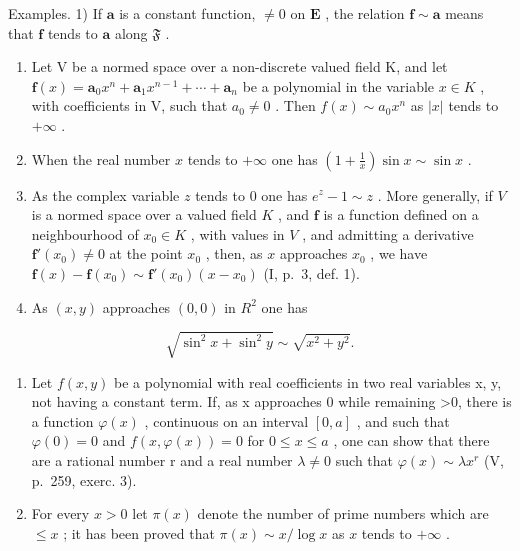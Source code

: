 Examples. 1) If \(\mathbf{a}\) is a constant function, \(\neq 0\) on \(\mathbf{E}\) , the relation \(\mathbf{f} \sim \mathbf{a}\) means that \(\mathbf{f}\) tends to \(\mathbf{a}\) along \(\mathfrak{F}\) .

\begin{enumerate}
\def\labelenumi{\arabic{enumi})}
\setcounter{enumi}{1}
\item
  Let V be a normed space over a non-discrete valued field K, and let \(\mathbf{f}(x)=\mathbf{a}_{0}x^{n}+\mathbf{a}_{1}x^{n-1}+\cdots+\mathbf{a}_{n}\) be a polynomial in the variable \(x\in K\) , with coefficients in V, such that \(a_{0}\neq0\) . Then \(f(x)\sim a_{0}x^{n}\) as \(|x|\) tends to \(+\infty\) .
\item
  When the real number \(x\) tends to \(+\infty\) one has \(\left(1 + \frac{1}{x}\right)\sin x \sim \sin x\) .
\item
  As the complex variable \(z\) tends to 0 one has \(e^z - 1 \sim z\) . More generally, if \(V\) is a normed space over a valued field \(K\) , and \(\mathbf{f}\) is a function defined on a neighbourhood of \(x_0 \in K\) , with values in \(V\) , and admitting a derivative \(\mathbf{f}'(x_0) \neq 0\) at the point \(x_0\) , then, as \(x\) approaches \(x_0\) , we have \(\mathbf{f}(x) - \mathbf{f}(x_0) \sim \mathbf{f}'(x_0)(x - x_0)\) (I, p.~3, def. 1).
\item
  As \((x, y)\) approaches \((0, 0)\) in \(R^{2}\) one has
\end{enumerate}

\[
\sqrt {\sin^ {2} x + \sin^ {2} y} \sim \sqrt {x ^ {2} + y ^ {2}}.
\]

\begin{enumerate}
\def\labelenumi{\arabic{enumi})}
\setcounter{enumi}{5}
\item
  Let \(f(x, y)\) be a polynomial with real coefficients in two real variables x, y, not having a constant term. If, as x approaches 0 while remaining \textgreater0, there is a function \(\varphi(x)\) , continuous on an interval \([0, a]\) , and such that \(\varphi(0) = 0\) and \(f(x, \varphi(x)) = 0\) for \(0 \leqslant x \leqslant a\) , one can show that there are a rational number r and a real number \(\lambda \neq 0\) such that \(\varphi(x) \sim \lambda x^{r}\) (V, p.~259, exerc. 3).
\item
  For every \(x > 0\) let \(\pi(x)\) denote the number of prime numbers which are \(\leqslant x\) ; it has been proved that \(\pi(x) \sim x / \log x\) as \(x\) tends to \(+\infty\) .
\end{enumerate}

